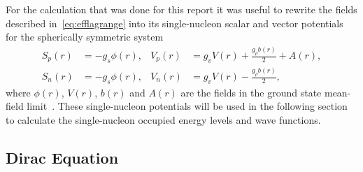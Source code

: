 \def\arraystretch{1.2}
\begin{table}
\caption{Parameters}
\label{table:params}
\centering
{}
\end{table}

For the calculation that was done for this report it was useful to rewrite the fields described in~\eqref{eq:efflagrange} into its single-nucleon scalar and vector potentials for the spherically symmetric system
\begin{align}
S_p(r) &= -g_s\phi (r),& V_p(r) &= g_v V(r)+ \frac{g_{\rho}b(r)}{2} + A(r), \\
S_n(r) &= -g_s\phi (r),& V_n(r) &= g_v V(r)- \frac{g_{\rho}b(r)}{2}, 
\end{align}
where $\phi (r)$, $V(r)$, $b(r)$ and $A(r)$ are the fields in the ground state mean-field limit~\cite{todd:2003:relativistic}. These single-nucleon potentials will be used in the following section to calculate the single-nucleon occupied energy levels and wave functions.

\subsection{Dirac Equation}

